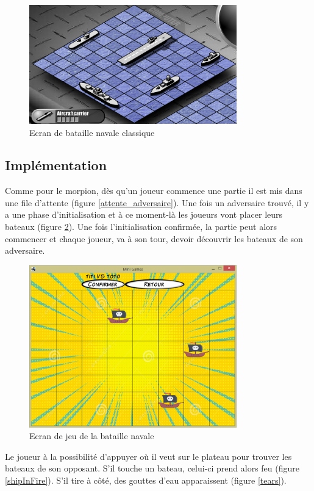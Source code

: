 \documentclass{report}
\begin{document}
\begin{figure}[H]
	\centering\includegraphics[width=9cm]{batailleClassique}
	\caption{Ecran de bataille navale classique}
	\label{batailleClassique}
\end{figure}

\subsection{Implémentation}
Comme pour le morpion, dès qu'un joueur commence une partie il est mis dans une file d'attente (figure \ref{attente_adversaire}).
Une fois un adversaire trouvé, il y a une phase d'initialisation et à ce moment-là les joueurs vont placer leurs bateaux (figure \ref{notreBataille}). Une fois l'initialisation confirmée,
la partie peut alors commencer et chaque joueur, va à son tour, devoir découvrir les bateaux de son adversaire.

\begin{figure}[H]
	\centering\includegraphics[width=9cm]{notreBataille}
	\caption{Ecran de jeu de la bataille navale}
	\label{notreBataille}
\end{figure}
Le joueur à la possibilité d'appuyer où il veut sur le plateau pour trouver les bateaux de son opposant. S'il touche un bateau, celui-ci prend alors feu (figure \ref{shipInFire}). S'il tire
à côté, des gouttes d'eau apparaissent (figure \ref{tears}).
\end{document}
